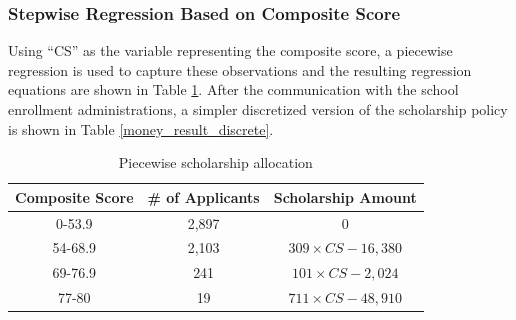 \documentclass[12pt,english]{report}
\begin{document}

%


\subsubsection{Stepwise Regression Based on Composite Score}
Using ``CS'' as the variable representing the composite score, a piecewise regression is used to capture these observations and the resulting regression equations are shown in Table \ref{money_result}. After the communication with the school enrollment administrations,  a simpler discretized version of the scholarship policy is shown in Table \ref{money_result_discrete}. 




\begin{table}[H]
\centering
\begin{tabular}{|c|c|c|}
\hline
Composite Score & \# of Applicants & Scholarship Amount \\ \hline
0-53.9         & 2,897  &0              \\ \hline
54-68.9        & 2,103  &$309\times CS -16,380 $            \\ \hline
69-76.9        &  241 &  $101\times CS - 2,024$           \\ \hline
77-80       & 19 &   $711 \times CS -48,910$          \\ \hline
\end{tabular}
\caption{Piecewise scholarship allocation}
\label{money_result}
\end{table}
\end{document}
